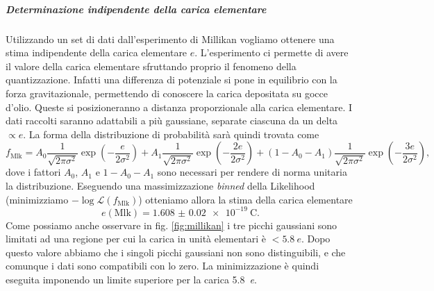 \documentclass[a4paper, varvw, nofootinbib]{revtex4-2}
\begin{document}
\subparagraph*{Determinazione indipendente della carica elementare}\label{sec:millikan} Utilizzando un set di dati dall'esperimento di Millikan vogliamo ottenere una stima indipendente della carica elementare $e$. L'esperimento ci permette di avere il valore della carica elementare sfruttando proprio il fenomeno della quantizzazione. Infatti una differenza di potenziale si pone in equilibrio con la forza gravitazionale, permettendo di conoscere la carica depositata su gocce d'olio. Queste si posizioneranno a distanza proporzionale alla carica elementare. I dati raccolti saranno adattabili a più gaussiane, separate ciascuna da un delta $\propto e$. La forma della distribuzione di probabilità sarà quindi trovata come \begin{equation} f_\text{Mlk} =  A_0 \frac{1}{\sqrt{2\pi\sigma^2}}\exp({-\frac{e}{2\sigma^2}}) +  A_1 \frac{1}{\sqrt{2\pi\sigma^2}}\exp({-\frac{2e}{2\sigma^2}}) + (1-A_0-A_1) \frac{1}{\sqrt{2\pi\sigma^2}}\exp({-\frac{3e}{2\sigma^2}}), \label{eq:6}\end{equation} dove i fattori $A_0$, $A_1$ e $1-A_0-A_1$ sono necessari per rendere di norma unitaria la distribuzione. Eseguendo una massimizzazione \emph{binned} della Likelihood (minimizziamo $-\log \mathcal L(f_\text{Mlk})$) otteniamo allora la stima della carica elementare \[e(\text{Mlk}) = \SI{1.608(20)e-19}{\coulomb}.\] Come possiamo anche osservare in fig. \ref{fig:millikan} i tre picchi gaussiani sono limitati ad una regione per cui la carica in unità elementari è $<\SI{5.8}{\elementarycharge}$. Dopo questo valore abbiamo che i singoli picchi gaussiani non sono distinguibili, e che comunque i dati sono compatibili con lo zero. La minimizzazione è quindi eseguita imponendo un limite superiore per la carica \SI{5.8}{\elementarycharge}.
\end{document}
